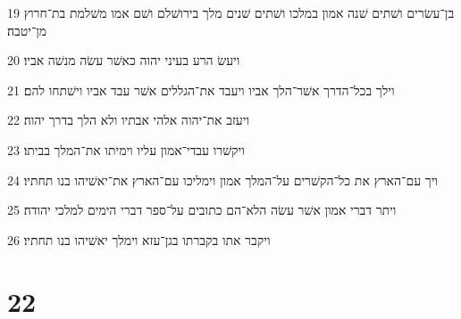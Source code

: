 \par 19 בן־עשׂרים ושׁתים שׁנה אמון במלכו ושׁתים שׁנים מלך בירושׁלם ושׁם אמו משׁלמת בת־חרוץ מן־יטבה׃
\par 20 ויעשׂ הרע בעיני יהוה כאשׁר עשׂה מנשׁה אביו׃
\par 21 וילך בכל־הדרך אשׁר־הלך אביו ויעבד את־הגללים אשׁר עבד אביו וישׁתחו להם׃
\par 22 ויעזב את־יהוה אלהי אבתיו ולא הלך בדרך יהוה׃
\par 23 ויקשׁרו עבדי־אמון עליו וימיתו את־המלך בביתו׃
\par 24 ויך עם־הארץ את כל־הקשׁרים על־המלך אמון וימליכו עם־הארץ את־יאשׁיהו בנו תחתיו׃
\par 25 ויתר דברי אמון אשׁר עשׂה הלא־הם כתובים על־ספר דברי הימים למלכי יהודה׃
\par 26 ויקבר אתו בקברתו בגן־עזא וימלך יאשׁיהו בנו תחתיו׃

\chapter{22}

